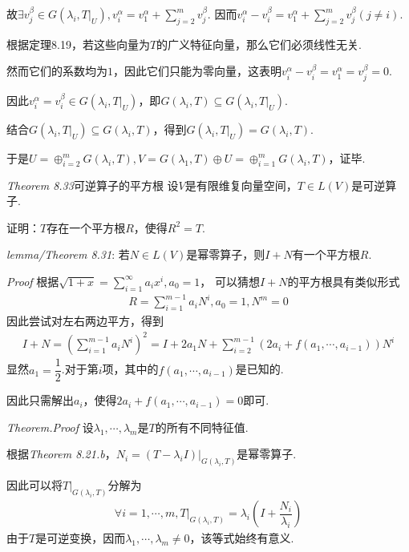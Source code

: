 故\(\exists v_j^\beta \in G(\lambda_i,T|_U),v_i^\alpha=v_1^\alpha+\sum_{j=2}^m v_j^\beta\).
因而\(v_i^\alpha-v_i^\beta=v_1^\alpha+\sum_{j=2}^m v_j^\beta(j \ne i)\).

根据定理8.19，若这些向量为\(T\)的广义特征向量，那么它们必须线性无关.

然而它们的系数均为\(1\)，因此它们只能为零向量，这表明\(v_i^\alpha-v_i^\beta=v_1^\alpha=v_j^\beta=0\).

因此\(v_i^\alpha=v_i^\beta \in G(\lambda_i,T|_U)\)，即\(G(\lambda_i,T) \subseteq G(\lambda_i,T|_U)\).

结合\(G(\lambda_i,T|_U) \subseteq G(\lambda_i,T)\)，得到\(G(\lambda_i,T|_U)=G(\lambda_i,T)\).

于是\(U=\oplus_{i=2}^m G(\lambda_i,T),V=G(\lambda_1,T) \oplus U=\oplus_{i=1}^m G(\lambda_i,T)\)，证毕.

\newpage

\textit{Theorem 8.33}{\kaishu 可逆算子的平方根}
设\(V\)是有限维复向量空间，\(T \in L(V)\)是可逆算子.

证明：\(T\)存在一个平方根\(R\)，使得\(R^2=T\).

\textit{lemma/Theorem 8.31}:
若\(N \in L(V)\)是幂零算子，则\(I+N\)有一个平方根\(R\).

\textit{Proof}
根据\(\sqrt{1+x}=\sum_{i=1}^\infty a_ix^i,a_0=1\)，
可以猜想\(I+N\)的平方根具有类似形式
    \begin{align*}
        R=\sum_{i=1}^{m-1} a_iN^i,a_0=1,N^m=0
    \end{align*}
因此尝试对左右两边平方，得到
    \begin{align*}
        I+N = (\sum_{i=1}^{m-1} a_iN^i)^2 
            = I+2a_1N+\sum_{i=2}^{m-1} (2a_i+f(a_1,\cdots,a_{i-1}))N^i
    \end{align*}
显然\(a_1=\dfrac{1}{2}\).对于第\(i\)项，其中的\(f(a_1,\cdots,a_{i-1})\)是已知的.

因此只需解出\(a_i\)，使得\(2a_i+f(a_1,\cdots,a_{i-1})=0\)即可.

\textit{Theorem.Proof}
设\(\lambda_1,\cdots,\lambda_m\)是\(T\)的所有不同特征值.

根据\textit{Theorem 8.21.b}，\(N_i=(T-\lambda_i I)|_{G(\lambda_i,T)}\)是幂零算子.

因此可以将\(T|_{G(\lambda_i,T)}\)分解为
    \begin{align*}
        \forall i=1,\cdots,m,T|_{G(\lambda_i,T)}=\lambda_i(I+\dfrac{N_i}{\lambda_i})
    \end{align*}
由于\(T\)是可逆变换，因而\(\lambda_1,\cdots,\lambda_m \ne 0\)，该等式始终有意义.

